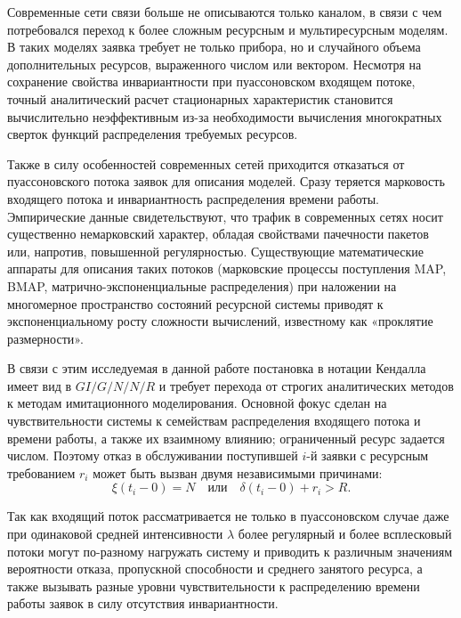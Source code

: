 Современные сети связи больше не описываются только каналом, в связи с чем потребовался переход к более сложным ресурсным и мультиресурсным моделям. В таких моделях заявка требует не только прибора, но и случайного объема дополнительных ресурсов, выраженного числом или вектором. Несмотря на сохранение свойства инвариантности при пуассоновском входящем потоке, точный аналитический расчет стационарных характеристик становится вычислительно неэффективным из-за необходимости вычисления многократных сверток функций распределения требуемых ресурсов. 

Также в силу особенностей современных сетей приходится отказаться от пуассоновского потока заявок для описания моделей. Сразу теряется марковость входящего потока и инвариантность распределения времени работы. Эмпирические данные свидетельствуют, что трафик в современных сетях носит существенно немарковский характер, обладая свойствами пачечности пакетов или, напротив, повышенной регулярностью. Существующие математические аппараты для описания таких потоков (марковские процессы поступления MAP, BMAP, матрично-экспоненциальные распределения) при наложении на многомерное пространство состояний ресурсной системы приводят к экспоненциальному росту сложности вычислений, известному как «проклятие размерности».

В связи с этим исследуемая в данной работе постановка в нотации Кендалла имеет вид в $GI/G/N/N/R$ и требует перехода от строгих аналитических методов к методам имитационного моделирования\cite{sopin2018_simulation_limited_resources,sopin2019_ecms_signals}. Основной фокус сделан на чувствительности системы к семействам распределения входящего потока и времени работы, а также их взаимному влиянию; ограниченный ресурс задается числом. Поэтому отказ в обслуживании поступившей $i$-й заявки с ресурсным требованием $r_i$ может быть вызван двумя независимыми причинами\cite{naumov_total_resources_2016,naumov_samouylov_multiresource_loss_2017}:
$$ \xi(t_i-0) = N \quad \text{или} \quad \delta(t_i-0) + r_i > R. $$

Так как входящий поток рассматривается не только в пуассоновском случае даже при одинаковой средней интенсивности $\lambda$ более регулярный и более всплесковый потоки могут по-разному нагружать систему\cite{paxson_floyd_1995_poisson_failure,vishnevskii_dudin_correlated_arrivals_2017} и приводить к различным значениям вероятности отказа, пропускной способности и среднего занятого ресурса, а также вызывать разные уровни чувствительности к распределению времени работы заявок в силу отсутствия инвариантности.

